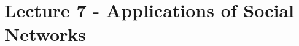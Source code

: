\section{Lecture 7 - Applications of Social Networks} %
\label{sec:lecture_7_applications_of_social_networks}

